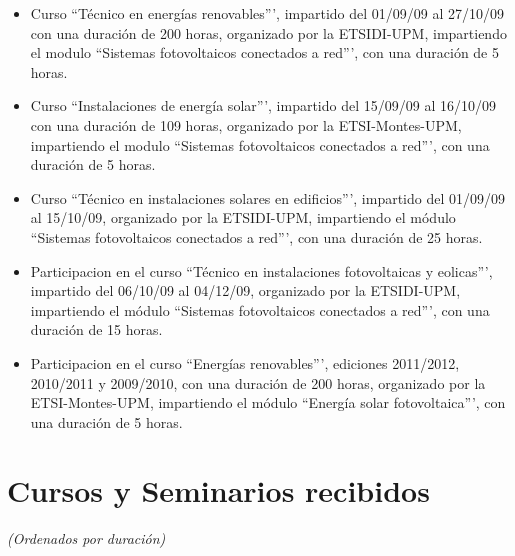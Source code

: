 \documentclass[article, a4paper]{memoir}
\begin{document}
\begin{itemize}
\item Curso ``Técnico en energías renovables''', impartido del 01/09/09 al 27/10/09 con una duración de 200 horas, organizado por la ETSIDI-UPM, impartiendo el modulo ``Sistemas fotovoltaicos conectados a red''', con una duración de 5 horas.

\item Curso ``Instalaciones de energía solar''', impartido del 15/09/09 al 16/10/09 con una duración de 109 horas, organizado por la ETSI-Montes-UPM, impartiendo el modulo ``Sistemas fotovoltaicos conectados a red''', con una duración de 5 horas.

\item Curso ``Técnico en instalaciones solares en edificios''', impartido del 01/09/09 al 15/10/09, organizado por la ETSIDI-UPM, impartiendo el módulo ``Sistemas fotovoltaicos conectados a red''', con una duración de 25 horas.

\item Participacion en el curso ``Técnico en instalaciones fotovoltaicas y eolicas''', impartido del 06/10/09 al 04/12/09, organizado por la ETSIDI-UPM, impartiendo el módulo ``Sistemas fotovoltaicos conectados a red''', con una duración de 15 horas.

\item Participacion en el curso ``Energías renovables''', ediciones 2011/2012, 2010/2011 y 2009/2010, con una duración de 200 horas, organizado por la ETSI-Montes-UPM, impartiendo el módulo ``Energía solar fotovoltaica''', con una duración de 5 horas.
\end{itemize}

\section{Cursos y Seminarios recibidos}
\label{sec-9}

\emph{(Ordenados por duración)}
\end{document}
